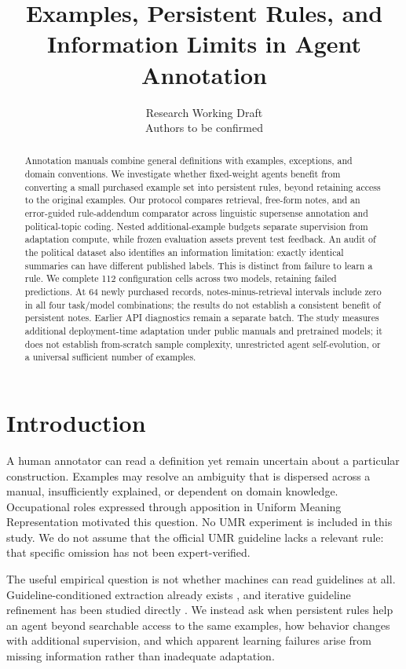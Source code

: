 \documentclass[11pt]{article}
\title{Examples, Persistent Rules, and Information Limits in Agent Annotation}
\author{Research Working Draft\\Authors to be confirmed}
\begin{document}
\maketitle
\begin{abstract}
Annotation manuals combine general definitions with examples, exceptions, and domain conventions. We investigate whether fixed-weight agents benefit from converting a small purchased example set into persistent rules, beyond retaining access to the original examples. Our protocol compares retrieval, free-form notes, and an error-guided rule-addendum comparator across linguistic supersense annotation and political-topic coding. Nested additional-example budgets separate supervision from adaptation compute, while frozen evaluation assets prevent test feedback. An audit of the political dataset also identifies an information limitation: exactly identical summaries can have different published labels. This is distinct from failure to learn a rule. We complete 112 configuration cells across two models, retaining failed predictions. At 64 newly purchased records, notes-minus-retrieval intervals include zero in all four task/model combinations; the results do not establish a consistent benefit of persistent notes. Earlier API diagnostics remain a separate batch. The study measures additional deployment-time adaptation under public manuals and pretrained models; it does not establish from-scratch sample complexity, unrestricted agent self-evolution, or a universal sufficient number of examples.
\end{abstract}


\section{Introduction}
A human annotator can read a definition yet remain uncertain about a particular construction. Examples may resolve an ambiguity that is dispersed across a manual, insufficiently explained, or dependent on domain knowledge. Occupational roles expressed through apposition in Uniform Meaning Representation motivated this question. No UMR experiment is included in this study. We do not assume that the official UMR guideline lacks a relevant rule: that specific omission has not been expert-verified.

The useful empirical question is not whether machines can read guidelines at all. Guideline-conditioned extraction already exists \citep{gollie}, and iterative guideline refinement has been studied directly \citep{kim2026refining}. We instead ask when persistent rules help an agent beyond searchable access to the same examples, how behavior changes with additional supervision, and which apparent learning failures arise from missing information rather than inadequate adaptation.
\end{document}
